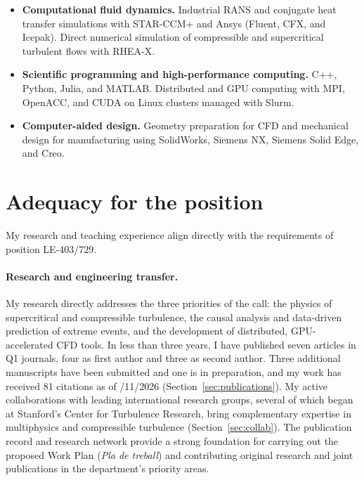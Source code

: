 \documentclass[11pt]{article}
\newcommand{\NEW}[1]{\iffinal #1\else{\color{red}#1}\fi} %
\begin{document}
\begin{itemize}[itemsep=2pt]
	\item \textbf{Computational fluid dynamics.} Industrial RANS and
	conjugate heat transfer simulations with STAR-CCM+ and Ansys (Fluent,
	CFX, and Icepak). Direct numerical simulation of compressible and
	supercritical turbulent flows with RHEA-X.
	\item \textbf{Scientific programming and high-performance computing.}
	C++, Python, Julia, and MATLAB. Distributed and GPU computing with
	MPI, OpenACC, and CUDA on Linux clusters managed with Slurm.
	\item \textbf{Computer-aided design.} Geometry preparation for CFD and
	mechanical design for manufacturing using SolidWorks, Siemens NX,
	Siemens Solid Edge, and Creo.
\end{itemize}


\section{Adequacy for the position}\label{sec:adequacy}

My research and teaching experience align directly with the requirements of position LE-403/729. 

\paragraph{Research and engineering transfer.}

My research directly addresses the three priorities of the call: the physics of supercritical and compressible turbulence, the causal analysis and data-driven prediction of extreme events, and the development of distributed, GPU-accelerated CFD tools. 
In less than three years, I \NEW{have} published seven articles in Q1 journals, four as first author and three as second author. 
Three additional manuscripts have been submitted and one is in preparation, and my work has received 81 citations as of \NEW{11/11/2026} (Section~\ref{sec:publications}).
My active collaborations with leading international research groups, several of which began at Stanford's Center for Turbulence Research, bring complementary expertise in multiphysics and compressible turbulence (Section~\ref{sec:collab}). 
The publication record and research network provide a strong foundation for carrying out the proposed Work Plan (\textit{Pla de treball}) and contributing original research and joint
publications in the department's priority areas.
\end{document}
